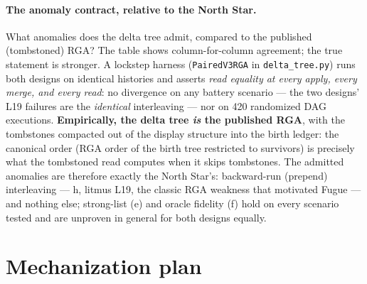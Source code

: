 \documentclass[11pt]{article}
\begin{document}
\paragraph{The anomaly contract, relative to the North Star.} What
anomalies does the delta tree admit, compared to the published
(tombstoned) RGA? The table shows column-for-column agreement; the true
statement is stronger. A lockstep harness (\texttt{PairedV3RGA} in
\texttt{delta\_tree.py}) runs both designs on identical histories and
asserts \emph{read equality at every apply, every merge, and every read}:
no divergence on any battery scenario --- the two designs' L19 failures
are the \emph{identical} interleaving --- nor on 420 randomized DAG
executions. \textbf{Empirically, the delta tree \emph{is} the published
RGA}, with the tombstones compacted out of the display structure into the
birth ledger: the canonical order (RGA order of the birth tree restricted
to survivors) is precisely what the tombstoned read computes when it
skips tombstones. The admitted anomalies are therefore exactly the North
Star's: backward-run (prepend) interleaving --- h, litmus L19, the
classic RGA weakness that motivated Fugue --- and nothing else;
strong-list (e) and oracle fidelity (f) hold on every scenario tested and
are unproven in general for both designs equally.

\section{Mechanization plan}
\label{sec:mech}
\end{document}
